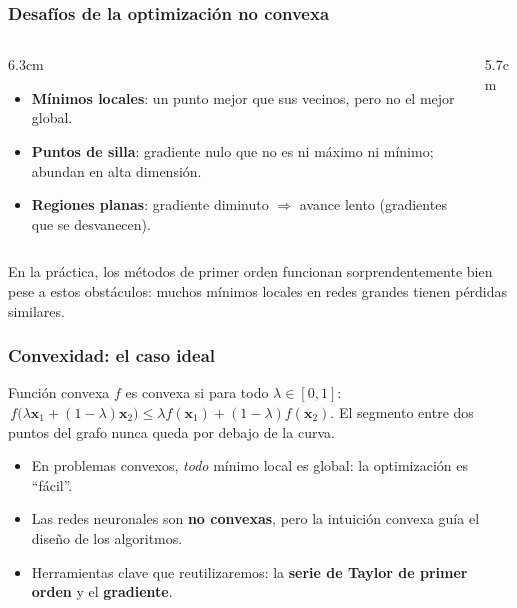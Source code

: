 \documentclass[aspectratio=169, 10pt]{beamer}
\newcommand{\xv}{\bm{x}}
\begin{document}
\begin{frame}
\frametitle{Desaf\'ios de la optimizaci\'on no convexa}
\begin{columns}[T]
\begin{column}{6.3cm}
\begin{itemize}
	\item \textbf{M\'inimos locales}: un punto mejor que sus vecinos, pero no el mejor global.
	\item \textbf{Puntos de silla}: gradiente nulo que no es ni m\'aximo ni m\'inimo; abundan en alta dimensi\'on.
	\item \textbf{Regiones planas}: gradiente diminuto $\Rightarrow$ avance lento (gradientes que se desvanecen).
\end{itemize}
\end{column}
\begin{column}{5.7cm}
\begin{center}
\end{center}
\end{column}
\end{columns}
\vspace{0.3em}
\footnotesize En la pr\'actica, los m\'etodos de primer orden funcionan sorprendentemente bien pese a estos obst\'aculos: muchos m\'inimos locales en redes grandes tienen p\'erdidas similares.
\end{frame}

\begin{frame}
\frametitle{Convexidad: el caso ideal}
\begin{block}{Funci\'on convexa}
$f$ es convexa si para todo $\lambda\in[0,1]$:
\(\, f\big(\lambda \xv_1 + (1-\lambda)\xv_2\big) \le \lambda f(\xv_1) + (1-\lambda) f(\xv_2).\)
El segmento entre dos puntos del grafo nunca queda por debajo de la curva.
\end{block}
\begin{itemize}
	\item En problemas convexos, \emph{todo} m\'inimo local es global: la optimizaci\'on es ``f\'acil''.
	\pause
	\item Las redes neuronales son \textbf{no convexas}, pero la intuici\'on convexa gu\'ia el dise\~no de los algoritmos.
	\pause
	\item Herramientas clave que reutilizaremos: la \textbf{serie de Taylor de primer orden} y el \textbf{gradiente}.
\end{itemize}
\end{frame}
\end{document}
